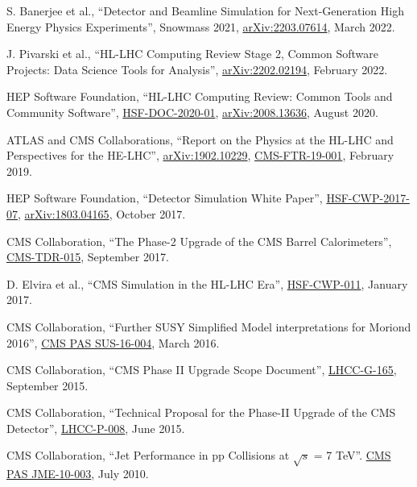 \begin{description}[leftmargin=12pt,font=\normalfont,labelsep=0em]
\item S. Banerjee et al., ``Detector and Beamline Simulation for Next-Generation High Energy Physics Experiments'', Snowmass 2021, \href{https://arxiv.org/abs/2203.07614}{arXiv:2203.07614}, March 2022. %
\item J. Pivarski et al., ``HL-LHC Computing Review Stage 2, Common Software Projects: Data Science Tools for Analysis'', \href{https://arxiv.org/abs/2202.02194}{arXiv:2202.02194}, February 2022. %
\item HEP Software Foundation, ``HL-LHC Computing Review: Common Tools and Community Software'', \href{https://dx.doi.org/10.5281/zenodo.4009114}{HSF-DOC-2020-01}, \href{https://arxiv.org/abs/2008.13636}{arXiv:2008.13636}, August 2020. %
\item \begin{sloppypar}ATLAS and CMS Collaborations, ``Report on the Physics at the HL-LHC and Perspectives for the HE-LHC'', \href{http://arxiv.org/abs/arXiv:1902.10229}{arXiv:1902.10229}, \href{https://cds.cern.ch/record/2651134}{CMS-FTR-19-001}, February 2019.\end{sloppypar} %
\item HEP Software Foundation, ``Detector Simulation White Paper'', \href{http://hepsoftwarefoundation.org/activities/cwp.html}{HSF-CWP-2017-07}, \href{https://arxiv.org/abs/1803.04165}{arXiv:1803.04165}, October 2017. %
\item CMS Collaboration, ``The Phase-2 Upgrade of the CMS Barrel Calorimeters'', \href{https://cds.cern.ch/record/2283187}{CMS-TDR-015}, September 2017.
\item D. Elvira et al., ``CMS Simulation in the HL-LHC Era'', \href{http://hepsoftwarefoundation.org/cwp-whitepapers.html}{HSF-CWP-011}, January 2017.
\item CMS Collaboration, ``Further SUSY Simplified Model interpretations for Moriond 2016'', \href{http://cds.cern.ch/record/2140312}{CMS PAS SUS-16-004}, March 2016. %
\item CMS Collaboration, ``CMS Phase II Upgrade Scope Document'', \href{https://cds.cern.ch/record/2055167}{LHCC-G-165}, September 2015.
\item CMS Collaboration, ``Technical Proposal for the Phase-II Upgrade of the CMS Detector'', \href{http://cds.cern.ch/record/2020886}{LHCC-P-008}, June 2015. %
\item CMS Collaboration, ``Jet Performance in pp Collisions at $\sqrt{s}$ = 7 TeV''. \href{http://cds.cern.ch/record/1279362}{CMS PAS JME-10-003}, July 2010. %
\end{description}

